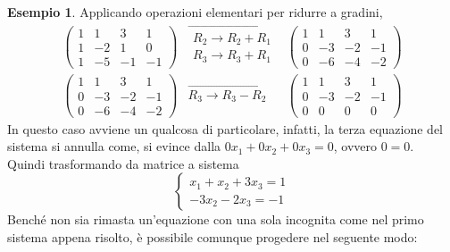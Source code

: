\documentclass{book}
\theoremstyle{definition}
\newtheorem{es}{Esempio}[section]
\theoremstyle{plain}
\begin{document}
\begin{es}
    Applicando operazioni elementari per ridurre a gradini,
    \begin{eqnarray}
      \label{eq:gauss-jorda2-4}
      \left(
      \begin{array}{ccc|c}
        1 & 1 & 3 & 1\\
        1 & -2 & 1 & 0\\
        1 & -5 & -1 & -1
      \end{array}\right) & \overrightarrow{
        \begin{matrix}
          R_2\to R_2+R_1\\
          R_3\to R_3+R_1
        \end{matrix}
      }& \left(
      \begin{array}{ccc|c}
        1 & 1 & 3 & 1\\
        0 & -3 & -2 & -1\\
        0 & -6 & -4 & -2
      \end{array}\right)\\
       \left(
       \begin{array}{ccc|c}
         1 & 1 & 3 & 1\\
         0 & -3 & -2 & -1\\
         0 & -6 & -4 & -2
       \end{array}\right) & \overrightarrow{
                             R_3\to R_3-R_2} &
                              \left(
      \begin{array}{ccc|c}
        1 & 1 & 3 & 1\\
        0 & -3 & -2 & -1\\
        0 & 0 & 0 & 0
      \end{array}\right)
    \end{eqnarray}
    In questo caso avviene un qualcosa di particolare, infatti, la terza
    equazione del sistema si annulla come, si evince dalla
    $0x_1+0x_2+0x_3 = 0$, ovvero $0 = 0$.\\
    Quindi trasformando da matrice a sistema
    \begin{equation}
      \label{eq:gauss-jorda2-5}
      \begin{cases}
        x_1+x_2+3x_3=1\\
        -3x_2-2x_3=-1
      \end{cases}
    \end{equation}
    Benché non sia rimasta un'equazione con una sola incognita come nel
    primo sistema appena risolto, è possibile comunque progedere
    nel seguente modo:\\

\end{es}
\end{document}
